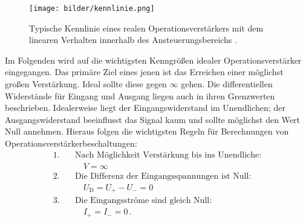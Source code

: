 \begin{figure}[H]
  \centering
  \texttt{[image: bilder/kennlinie.png]}
  \caption{Typische Kennlinie eines realen Operationsverstärkers mit dem linearen Verhalten innerhalb des Ansteuerungsbereichs \cite{anleitung}.}
  \label{kennlinie}
\end{figure}

Im Folgenden wird auf die wichtigsten Kenngrößen idealer Operationsverstärker eingegangen.
Das primäre Ziel eines jenen ist das Erreichen einer möglichst großen Verstärkung. Ideal sollte diese gegen $\infty$ gehen.
Die differentiellen Widerstände für Eingang und Ausgang liegen auch in ihren Grenzwerten beschrieben.
Idealerweise liegt der Eingangswiderstand im Unendlichen; der Ausgangswiderstand beeinflusst das Signal kaum und sollte möglichst den Wert Null annehmen.
Hieraus folgen die wichtigsten Regeln für Berechnungen von Operationsverstärkerbeschaltungen:
\begin{align*}
1.\quad& \text{Nach Möglichkeit Verstärkung bis ins Unendliche:}\\
&\quad V=\infty\\
2.\quad& \text{Die Differenz der Eingangsspannungen ist Null:}\\
&\quad U_\text{D}=U_+-U_-=0\\
3.\quad& \text{Die Eingangsströme sind gleich Null:}\\
&\quad I_+=I_-=0\,.
\end{align*}
